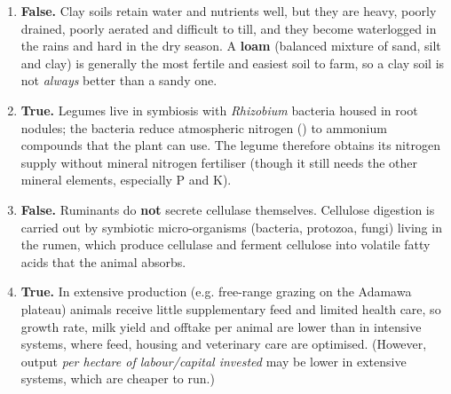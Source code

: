 \documentclass[11pt]{article}
\begin{document}
\begin{corrige}
\begin{enumerate}
\item \textbf{False.} Clay soils retain water and nutrients well, but they are heavy, poorly drained, poorly aerated and difficult to till, and they become waterlogged in the rains and hard in the dry season. A \textbf{loam} (balanced mixture of sand, silt and clay) is generally the most fertile and easiest soil to farm, so a clay soil is not \emph{always} better than a sandy one.
\item \textbf{True.} Legumes live in symbiosis with \emph{Rhizobium} bacteria housed in root nodules; the bacteria reduce atmospheric nitrogen () to ammonium compounds that the plant can use. The legume therefore obtains its nitrogen supply without mineral nitrogen fertiliser (though it still needs the other mineral elements, especially P and K).
\item \textbf{False.} Ruminants do \textbf{not} secrete cellulase themselves. Cellulose digestion is carried out by symbiotic micro-organisms (bacteria, protozoa, fungi) living in the rumen, which produce cellulase and ferment cellulose into volatile fatty acids that the animal absorbs.
\item \textbf{True.} In extensive production (e.g. free-range grazing on the Adamawa plateau) animals receive little supplementary feed and limited health care, so growth rate, milk yield and offtake per animal are lower than in intensive systems, where feed, housing and veterinary care are optimised. (However, output \emph{per hectare of labour/capital invested} may be lower in extensive systems, which are cheaper to run.)
\end{enumerate}
\end{corrige}
\end{document}
